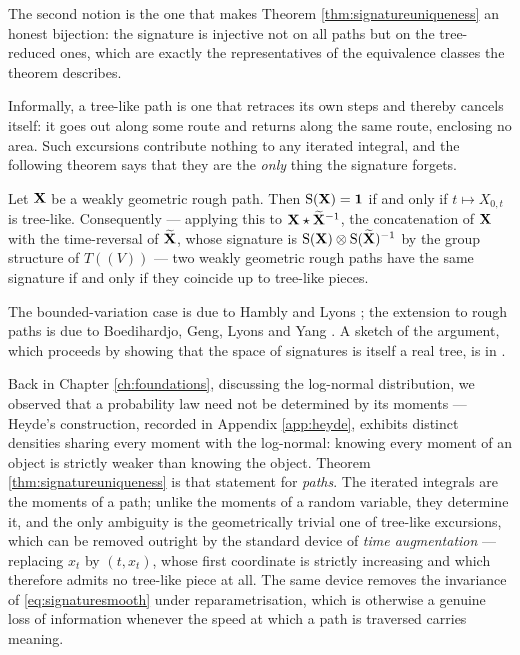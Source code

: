 The second notion is the one that makes Theorem \ref{thm:signatureuniqueness} an honest
bijection: the signature is injective not on all paths but on the tree-reduced ones, which are
exactly the representatives of the equivalence classes the theorem describes.

Informally, a tree-like path is one that retraces its own steps and thereby cancels itself: it goes
out along some route and returns along the same route, enclosing no area. Such excursions contribute
nothing to any iterated integral, and the following theorem says that they are the \emph{only} thing
the signature forgets.

\begin{theorem}\label{thm:signatureuniqueness}
Let $\mathbf{X}$ be a weakly geometric rough path. Then $\mathrm{S}(\mathbf{X}) = \mathbf{1}$ if and only if
$t\mapsto X_{0,t}$ is tree-like. Consequently --- applying this to
$\mathbf{X} \star \widetilde{\mathbf{X}}^{-1}$, the concatenation of $\mathbf{X}$ with the time-reversal of
$\widetilde{\mathbf{X}}$, whose signature is $\mathrm{S}(\mathbf{X})\otimes\mathrm{S}(\widetilde{\mathbf{X}})^{-1}$ by the group
structure of $T((V))$ --- two weakly geometric rough paths have the same
signature if and only if they coincide up to tree-like pieces. \qedopentext
\end{theorem}

The bounded-variation case is due to Hambly and Lyons \cite{hamblylyons2010}; the extension to rough
paths is due to Boedihardjo, Geng, Lyons and Yang \cite{boedihardjo2016}. A sketch of the argument,
which proceeds by showing that the space of signatures is itself a real tree, is in
\cite[§4.3]{geng2021}.

\medskip

Back in Chapter \ref{ch:foundations}, discussing the log-normal
distribution, we observed that a probability law need not be determined by its moments --- Heyde's
construction, recorded in Appendix \ref{app:heyde}, exhibits distinct densities sharing every
moment with the log-normal: knowing every moment of an object is strictly weaker than knowing the
object. Theorem \ref{thm:signatureuniqueness} is that statement for \textit{paths}. The iterated
integrals are the moments of a path; unlike the moments of a random variable, they determine it,
and the only ambiguity is the geometrically trivial one of tree-like excursions, which can be
removed outright by the standard device of \emph{time augmentation} --- replacing $x_t$ by
$(t, x_t)$, whose first coordinate is strictly increasing and which therefore admits no tree-like
piece at all. The same device removes the invariance of \eqref{eq:signaturesmooth} under
reparametrisation, which is otherwise a genuine loss of information whenever the speed at which a
path is traversed carries meaning.


